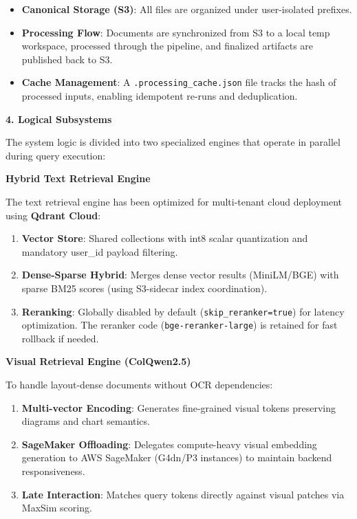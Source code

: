 \begin{itemize}
    \item \textbf{Canonical Storage (S3)}: All files are organized under user-isolated prefixes.
    \item \textbf{Processing Flow}: Documents are synchronized from S3 to a local temp workspace, processed through the pipeline, and finalized artifacts are published back to S3.
    \item \textbf{Cache Management}: A \texttt{.processing\_cache.json} file tracks the hash of processed inputs, enabling idempotent re-runs and deduplication.
\end{itemize}


\textbf{4. Logical Subsystems}

The system logic is divided into two specialized engines that operate in parallel during query execution:


\textbf{Hybrid Text Retrieval Engine}

The text retrieval engine has been optimized for multi-tenant cloud deployment using \textbf{Qdrant Cloud}:
\begin{enumerate}
    \item \textbf{Vector Store}: Shared collections with int8 scalar quantization and mandatory user\_id payload filtering.
    \item \textbf{Dense-Sparse Hybrid}: Merges dense vector results (MiniLM/BGE) with sparse BM25 scores (using S3-sidecar index coordination).
    
    \item \textbf{Reranking}: Globally disabled by default (\texttt{skip\_reranker=true}) for latency optimization. The reranker code (\texttt{bge-reranker-large}) is retained for fast rollback if needed.
    

\end{enumerate}


\textbf{Visual Retrieval Engine (ColQwen2.5)}

To handle layout-dense documents without OCR dependencies:
\begin{enumerate}
    \item \textbf{Multi-vector Encoding}: Generates fine-grained visual tokens preserving diagrams and chart semantics.
    \item \textbf{SageMaker Offloading}: Delegates compute-heavy visual embedding generation to AWS SageMaker (G4dn/P3 instances) to maintain backend responsiveness.
    \item \textbf{Late Interaction}: Matches query tokens directly against visual patches via MaxSim scoring.
\end{enumerate}


